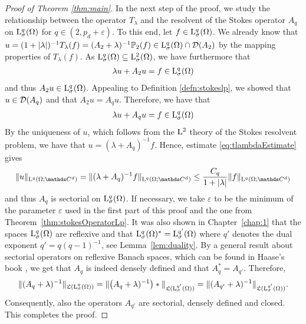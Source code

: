 \begin{proof}[Proof of Theorem \ref{thm:main}]
  In the next step of the proof, we study the relationship between the operator $T_\lambda$ and the resolvent of the Stokes operator $A_q$ on $\mathrm{L}^q_\sigma(\Omega)$ for $q \in (2, p_d + \varepsilon)$.
  To this end, let $f \in \mathrm{L}^q_\sigma(\Omega)$.
  We already know that $u = (1 + |\lambda|)^{-1} T_\lambda(f) = (A_2 + \lambda)^{-1} \mathbb{P}_2(f) \in \mathrm{L}^q_\sigma(\Omega) \cap \mathcal{D}(A_2)$  by the mapping properties of $T_\lambda(f)$.
  As $\mathrm{L}^q_\sigma(\Omega) \subseteq \mathrm{L}^2_\sigma(\Omega)$, we have furthermore that
  \begin{align*}
    \lambda u + A_2 u = f \in \mathrm{L}^q_\sigma(\Omega)
  \end{align*}
  and thus $A_2 u \in \mathrm{L}^q_\sigma(\Omega)$.
  Appealing to Definition \ref{defn:stokeslp}, we showed that $u \in \mathcal{D}(A_q)$ and that $A_2u = A_q u$. 
  Therefore, we have that
  \begin{align*}
    \lambda u + A_q u = f \in \mathrm{L}^q_\sigma(\Omega)
  \end{align*}
  By the uniqueness of $u$, which follows from the $\mathrm{L}^2$ theory of the Stokes resolvent problem, we have that $u = (\lambda + A_q)^{-1} f$.
  Hence, estimate \ref{eq:tlambdaEstimate} gives
  \begin{align*}
    \|u\|_{\Ell^q(\Omega; \C^d)} = \|(\lambda + A_q)^{-1}f \|_{\Ell^q(\Omega; \C^d)}
    \leq \frac{C_q}{ 1 + |\lambda|} \|f\|_{\Ell^q(\Omega; \C^d)}
  \end{align*}
  and thus $A_q$ is sectorial on $\mathrm{L}^q_\sigma(\Omega)$.
  If necessary, we take $\varepsilon$ to be the minimum of the parameter $\varepsilon$ used in the first part of this proof and the one from Theorem~\ref{thm:stokesOperatorLp}.
  It was also shown in Chapter~\ref{chap:1} that the spaces $\mathrm{L}^q_\sigma(\Omega)$ are reflexive and that $\mathrm{L}^q_\sigma(\Omega)^* = \mathrm{L}^{q'}_\sigma(\Omega)$ where $q'$ denotes the dual exponent $q' = q (q - 1)^{-1}$, see Lemma~\ref{lem:duality}.
  By a general result about sectorial operators on reflexive Banach spaces, which can be found in Haase's book \cite[Prop. 2.1.1]{haase}, we get that $A_q$ is indeed densely defined and that $A_q^* =  A_{q'}$.
  Therefore,
  \begin{align*}
    \| (A_q + \lambda)^{-1} \|_{\mathfrak{L}(\mathrm{L}^q_\sigma(\Omega))}
    = \| \big(A_q + \lambda)^{-1}\big)* \|_{\mathfrak{L}(\mathrm{L}^{q'}_\sigma(\Omega))}
    = \| (A_{q'} + \lambda)^{-1} \|_{\mathfrak{L}(\mathrm{L}^{q'}_\sigma(\Omega))}.
  \end{align*}
  Consequently, also the operators $A_{q'}$ are sectorial, densely defined and closed.
  This completes the proof.
\end{proof}
